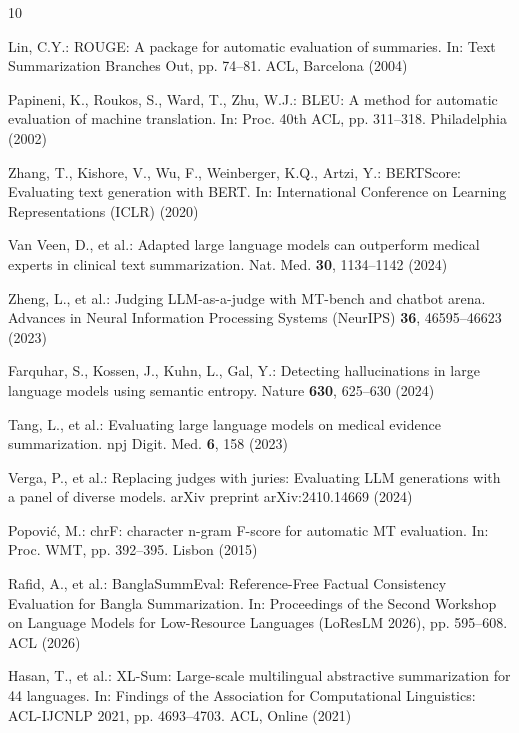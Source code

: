 \documentclass[runningheads]{llncs}
\begin{document}
%
%
\begin{thebibliography}{10}

Lin, C.Y.: ROUGE: A package for automatic evaluation of summaries. In: Text Summarization Branches Out, pp. 74--81. ACL, Barcelona (2004)

Papineni, K., Roukos, S., Ward, T., Zhu, W.J.: BLEU: A method for automatic evaluation of machine translation. In: Proc. 40th ACL, pp. 311--318. Philadelphia (2002)

Zhang, T., Kishore, V., Wu, F., Weinberger, K.Q., Artzi, Y.: BERTScore: Evaluating text generation with BERT. In: International Conference on Learning Representations (ICLR) (2020)

Van Veen, D., et al.: Adapted large language models can outperform medical experts in clinical text summarization. Nat. Med. \textbf{30}, 1134--1142 (2024)

Zheng, L., et al.: Judging LLM-as-a-judge with MT-bench and chatbot arena. Advances in Neural Information Processing Systems (NeurIPS) \textbf{36}, 46595--46623 (2023)

Farquhar, S., Kossen, J., Kuhn, L., Gal, Y.: Detecting hallucinations in large language models using semantic entropy. Nature \textbf{630}, 625--630 (2024)

Tang, L., et al.: Evaluating large language models on medical evidence summarization. npj Digit. Med. \textbf{6}, 158 (2023)

Verga, P., et al.: Replacing judges with juries: Evaluating LLM generations with a panel of diverse models. arXiv preprint arXiv:2410.14669 (2024)

Popovi\'c, M.: chrF: character n-gram F-score for automatic MT evaluation. In: Proc. WMT, pp. 392--395. Lisbon (2015)

Rafid, A., et al.: BanglaSummEval: Reference-Free Factual Consistency Evaluation for Bangla Summarization. In: Proceedings of the Second Workshop on Language Models for Low-Resource Languages (LoResLM 2026), pp. 595--608. ACL (2026)

Hasan, T., et al.: XL-Sum: Large-scale multilingual abstractive summarization for 44 languages. In: Findings of the Association for Computational Linguistics: ACL-IJCNLP 2021, pp. 4693--4703. ACL, Online (2021)

\end{thebibliography}
\end{document}
